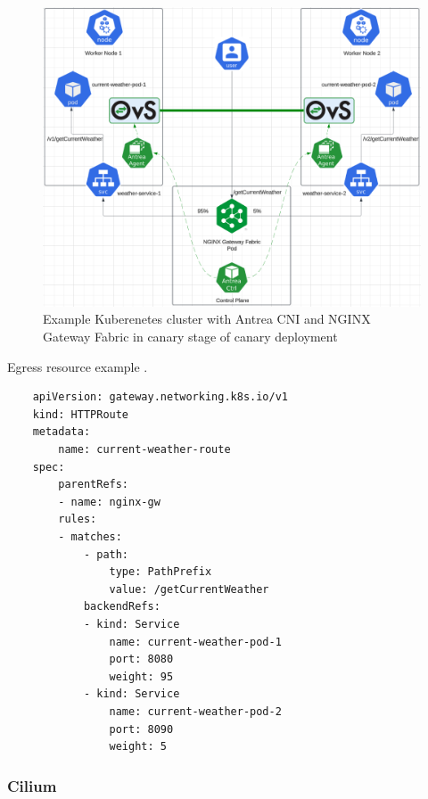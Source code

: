 \begin{figure}[H]
    \centering
    \includegraphics[width=1\columnwidth]{images/antrea-nginx.png}
    \caption{Example Kuberenetes cluster with Antrea CNI and NGINX Gateway Fabric in canary stage of canary deployment}
    \label{fig:canaryAntreaImg}
\end{figure}

\begin{listing}[htb]
    \centering
    \caption{Egress resource example \cite{AntreaEgressArch}.}
    \begin{verbatim}
    apiVersion: gateway.networking.k8s.io/v1
    kind: HTTPRoute
    metadata:
        name: current-weather-route
    spec:
        parentRefs:
        - name: nginx-gw
        rules:
        - matches:
            - path:
                type: PathPrefix
                value: /getCurrentWeather
            backendRefs:
            - kind: Service
                name: current-weather-pod-1
                port: 8080
                weight: 95
            - kind: Service
                name: current-weather-pod-2
                port: 8090
                weight: 5
    \end{verbatim}
    \label{lst:yamlAntreaIngressCanaryHTTPRoute}
\end{listing}

\subsubsection{Cilium}
\label{subsection:ciliumIngress}

